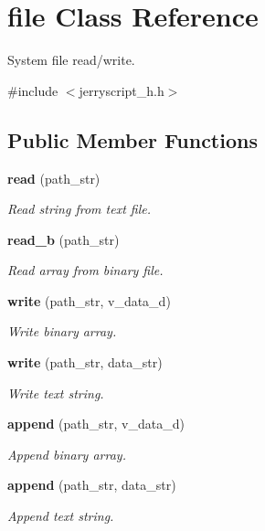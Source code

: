 \section{file Class Reference}
\label{classfile}


System file read/write.  




{\ttfamily \#include $<$jerryscript\+\_\+h.\+h$>$}

\subsection*{Public Member Functions}
\begin{DoxyCompactItemize}
\item 
\textbf{ read} (path\+\_\+str)
\begin{DoxyCompactList}\small\item\em Read string from text file. \end{DoxyCompactList}\item 
\textbf{ read\+\_\+b} (path\+\_\+str)
\begin{DoxyCompactList}\small\item\em Read array from binary file. \end{DoxyCompactList}\item 
\textbf{ write} (path\+\_\+str, v\+\_\+data\+\_\+d)
\begin{DoxyCompactList}\small\item\em Write binary array. \end{DoxyCompactList}\item 
\textbf{ write} (path\+\_\+str, data\+\_\+str)
\begin{DoxyCompactList}\small\item\em Write text string. \end{DoxyCompactList}\item 
\textbf{ append} (path\+\_\+str, v\+\_\+data\+\_\+d)
\begin{DoxyCompactList}\small\item\em Append binary array. \end{DoxyCompactList}\item 
\textbf{ append} (path\+\_\+str, data\+\_\+str)
\begin{DoxyCompactList}\small\item\em Append text string. \end{DoxyCompactList}\end{DoxyCompactItemize}


